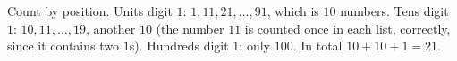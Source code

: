 Count by position. Units digit $1$: $1,11,21,\dots,91$, which is $10$ numbers. Tens digit $1$: $10,11,\dots,19$, another $10$ (the number $11$ is counted once in each list, correctly, since it contains two $1$s). Hundreds digit $1$: only $100$. In total $10+10+1=\boxed{21}$.
